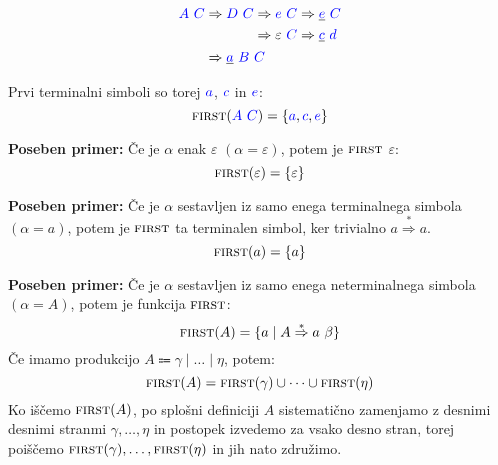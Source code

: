 \documentclass{article}
\newcommand{\Special}[1]{\textbf{#1}}
\newcommand{\FIRST}{\textsc{first}}
\newcommand{\Symbol}[1]{\textcolor{blue}{#1}}
\newcommand{\Null}{\varepsilon}
\newcommand{\Arrow}{\Coloneq}
\newcommand{\Derive}{\Rightarrow}
\newcommand{\DeriveStar}{\overset{\ast}{\Rightarrow}}
\newcommand{\Seq}{\ }
\newcommand{\Union}{\mathrel{|}}
\begin{document}
\begin{equation*}
  \Symbol{A} \Seq \Symbol{C} \begin{aligned}[t]
    &\Derive \Symbol{D} \Seq \Symbol{C} \begin{aligned}[t]
      &\Derive \Symbol{e} \Seq \Symbol{C} \Derive \underline{\Symbol{e}} \Seq \Symbol{C} \\
      &\Derive \Null \Seq \Symbol{C} \Derive \underline{\Symbol{c}} \Seq \Symbol{d} \\
    \end{aligned}\\
    &\Derive \underline{\Symbol{a}} \Seq \Symbol{B} \Seq \Symbol{C}
  \end{aligned}
\end{equation*}

Prvi terminalni simboli so torej $\Symbol{a}$, $\Symbol{c}$ in $\Symbol{e}$:
\begin{equation*}
  \FIRST(\Symbol{A} \Seq \Symbol{C}) = \{\Symbol{a}, \Symbol{c}, \Symbol{e}\}
\end{equation*}

\Special{Poseben primer:} Če je $\alpha$ enak $\Null$ ${(\alpha = \Null)}$, potem je $\FIRST$ $\Null$:
\begin{equation*}
  \FIRST(\Null) = \{ \Null \}
\end{equation*}

\Special{Poseben primer:} Če je $\alpha$ sestavljen iz samo enega terminalnega simbola ${(\alpha = a)}$, potem je $\FIRST$ ta terminalen simbol, ker trivialno $a \DeriveStar a$.
\begin{equation*}
  \FIRST(a) = \{ a \}
\end{equation*}

\Special{Poseben primer:} Če je $\alpha$ sestavljen iz samo enega neterminalnega simbola ${(\alpha = A)}$, potem je funkcija $\FIRST$:
\begin{equation*}
  \FIRST(A) = \{ a \mid A \DeriveStar a \Seq \beta \}
\end{equation*}
Če imamo produkcijo $A \Arrow \gamma \Union \dots \Union \eta$, potem:
\begin{equation*}
  \FIRST(A) = \FIRST(\gamma) \cup \dots \cup \FIRST(\eta)
\end{equation*}
Ko iščemo $\FIRST(A)$, po splošni definiciji $A$ sistematično zamenjamo z desnimi desnimi stranmi $\gamma, \dots, \eta$ in postopek izvedemo za vsako desno stran, torej poiščemo $\FIRST(\gamma), \dots, \FIRST(\eta)$ in jih nato združimo.
\end{document}
